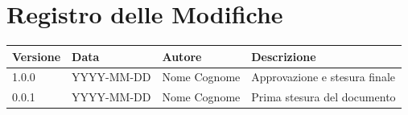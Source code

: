 \section*{Registro delle Modifiche}
\begin{table}[ht]
	\centering
	\renewcommand{\arraystretch}{1.5}
	\begin{tabularx}{\textwidth}{l l l X}
		\toprule
		\textbf{Versione} & \textbf{Data} & \textbf{Autore} & \textbf{Descrizione} \\
		\midrule
		1.0.0 & YYYY-MM-DD & Nome Cognome & Approvazione e stesura finale \\
		0.0.1 & YYYY-MM-DD & Nome Cognome & Prima stesura del documento \\
		\bottomrule
	\end{tabularx}
\end{table}